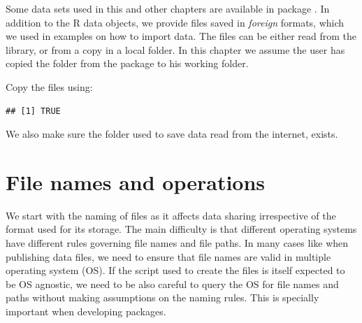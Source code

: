 \documentclass[krantz2]{krantz}\usepackage{knitr}%
\begin{document}
\begin{infobox}
Some data sets used in this and other chapters are available in package . In addition to the
R data objects, we provide files saved in \emph{foreign} formats, which we used in examples on how to import data. The files can be either read from the \Rlang library, or from a copy in a local folder. In this chapter we
assume the user has copied the folder  from the package to his working folder.

Copy the files using:

\begin{knitrout}\footnotesize
{}\color{fgcolor}\begin{kframe}
\begin{alltt}
 \hlkwb{<-} \hlstd{(}\hlstd{,}  \hlstd{=} \hlstd{)}
 \hlstd{,}  \hlstd{=} \hlstd{,}  \hlstd{=} \hlstd{)}
\end{alltt}
\begin{verbatim}
## [1] TRUE
\end{verbatim}
\end{kframe}
\end{knitrout}

We also make sure the folder used to save data read from the internet, exists.

\begin{knitrout}\footnotesize
{}\color{fgcolor}\begin{kframe}
\begin{alltt}
 \hlkwb{=} 
 \hlstd{(}\hlopt{!}
\hlstd{\}}
\end{alltt}
\end{kframe}
\end{knitrout}
\end{infobox}

\section{File names and operations}\label{sec:files:filenames}
We start with the naming of files as it affects data sharing irrespective of the format used for its storage. The main difficulty is that different operating systems have different rules governing file names and file paths. In many cases like when publishing data files, we need to ensure that file names are valid in multiple operating system (OS). If the script used to create the files is itself expected to be OS agnostic, we need to be also careful to query the OS for file names and paths without making assumptions on the naming rules. This is specially important when developing \Rlang packages.
\end{document}
